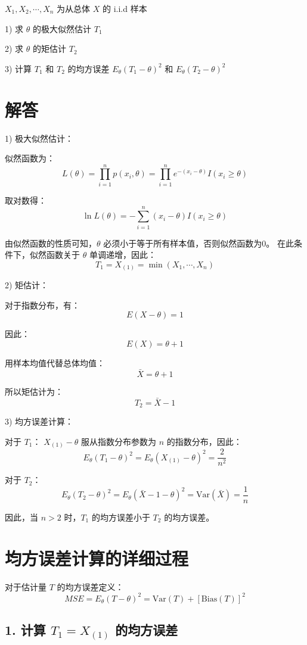 \documentclass[UTF8]{report}
\theoremstyle{MyLineTheoremStyle} %
\theoremstyle{MyBlockTheoremStyle} %
\theoremstyle{MySubsubsectionStyle} %
\begin{document}
$X_1,X_2,\cdots,X_n$ 为从总体 $X$ 的 i.i.d 样本

1) 求 $\theta$ 的极大似然估计 $T_1$

2) 求 $\theta$ 的矩估计 $T_2$

3) 计算 $T_1$ 和 $T_2$ 的均方误差 $E_\theta(T_1-\theta)^2$ 和 $E_\theta(T_2-\theta)^2$

\section*{解答}

1) 极大似然估计：

似然函数为：
$$
L(\theta)=\prod_{i=1}^n p(x_i,\theta)=\prod_{i=1}^n e^{-(x_i-\theta)}I(x_i \geq \theta)
$$

取对数得：
$$
\ln L(\theta)=-\sum_{i=1}^n(x_i-\theta)I(x_i \geq \theta)
$$

由似然函数的性质可知，$\theta$ 必须小于等于所有样本值，否则似然函数为0。
在此条件下，似然函数关于 $\theta$ 单调递增，因此：
$$
T_1=X_{(1)}=\min(X_1,\cdots,X_n)
$$

2) 矩估计：

对于指数分布，有：
$$
E(X-\theta)=1
$$

因此：
$$
E(X)=\theta+1
$$

用样本均值代替总体均值：
$$
\bar{X}=\theta+1
$$

所以矩估计为：
$$
T_2=\bar{X}-1
$$

3) 均方误差计算：

对于 $T_1$：
$X_{(1)}-\theta$ 服从指数分布参数为 $n$ 的指数分布，因此：
$$
E_\theta(T_1-\theta)^2=E_\theta(X_{(1)}-\theta)^2=\frac{2}{n^2}
$$

对于 $T_2$：
$$
E_\theta(T_2-\theta)^2=E_\theta(\bar{X}-1-\theta)^2=\text{Var}(\bar{X})=\frac{1}{n}
$$

因此，当 $n>2$ 时，$T_1$ 的均方误差小于 $T_2$ 的均方误差。



\section*{均方误差计算的详细过程}

对于估计量 $T$ 的均方误差定义：
$$
MSE = E_\theta(T-\theta)^2 = \text{Var}(T) + [\text{Bias}(T)]^2
$$

\subsection*{1. 计算 $T_1 = X_{(1)}$ 的均方误差}
\end{document}

